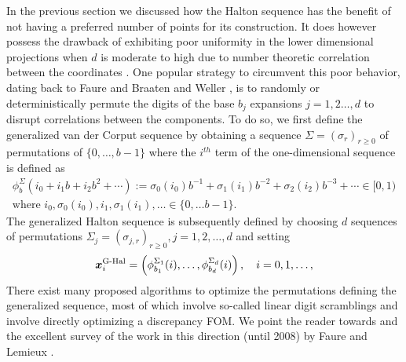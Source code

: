 \documentclass{svproc}
\newcounter{algorithm}%
\begin{document}


In the previous section we discussed how the Halton sequence has the benefit of not having a preferred number of points for its construction. It does however possess the drawback of exhibiting poor uniformity in the lower dimensional projections when $d$ is moderate to high due to number theoretic correlation between the coordinates \cite{kirklem24}. One popular strategy to circumvent this poor behavior, dating back to Faure \cite{fau78} and Braaten and Weller \cite{brawell79}, is to randomly or deterministically permute the digits of the base $b_j$ expansions $j = 1,2\ldots,d$ to disrupt correlations between the components. To do so, we first define the generalized van der Corput sequence by obtaining a sequence $\Sigma = (\sigma_r)_{r\geq0}$ of permutations of $\{0,\ldots,b-1\}$ where the $i^{th}$ term of the one-dimensional sequence is defined as 
\begin{multline}\label{eq:gen_vdc}
    \phi_b^{\Sigma}(i_0 + i_1b + i_2 b^2 + \cdots ) := \sigma_0(i_0) b^{-1} + \sigma_1(i_1) b^{-2} + \sigma_2(i_2) b^{-3} + \cdots \in [0,1)
	\\
	 \text{where } i_0, \sigma_0(i_0), i_1, \sigma_1(i_1), \ldots \in \{0,\ldots b-1\}.
\end{multline}
The generalized Halton sequence is subsequently defined by choosing $d$ sequences of permutations $\Sigma_j = (\sigma_{j,r})_{r\geq0}, j = 1, 2,\ldots,d$ and setting
$${\boldsymbol{x}}_i^{\text{G-Hal}} = \left( \phi^{\Sigma_1}_{b_1}(i), \ldots, \phi^{\Sigma_d}_{b_d}(i)\right), \quad i= 0,1,\ldots,$$
There exist many proposed algorithms to optimize the permutations defining the generalized sequence, most of which involve so-called linear digit scramblings and involve directly optimizing a discrepancy FOM. We point the reader towards \cite{MasChiWar05,tuffin98,Atan04,vancools06} and the excellent survey of the work in this direction (until 2008) by Faure and Lemieux \cite{faulem09}.
\end{document}
